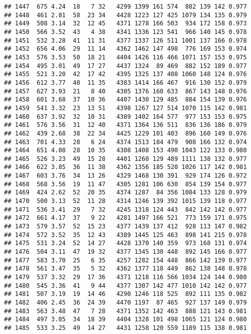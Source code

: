 \documentclass[]{article}
\begin{document}
\begin{verbatim}
## 1447  675 4.24  18   7 32   4299 1399 161 574  882 139 142 0.977
## 1448  461 2.81  58  23 34   4428 1223 127 425 1079 134 135 0.979
## 1449  508 3.14  32  12 45   4371 1278 166 503  934 172 158 0.973
## 1450  566 3.52  43   4 38   4341 1336 123 541  966 140 145 0.978
## 1451  532 3.28  41  11 31   4377 1337 126 511 1001 137 166 0.978
## 1452  656 4.06  29  11 14   4362 1462 147 498  776 169 153 0.974
## 1453  576 3.53  50  18 21   4404 1426 116 466 1071 157 153 0.975
## 1454  495 3.01  49  17 27   4437 1324  89 469  882 152 189 0.977
## 1455  521 3.20  42  17 42   4395 1325 137 408 1060 148 124 0.976
## 1456  612 3.77  40  11 35   4383 1414 166 467  916 130 152 0.979
## 1457  627 3.93  21   8 40   4305 1376 160 633  867 143 148 0.976
## 1458  601 3.68  37  10 36   4407 1430 129 485  884 154 139 0.976
## 1459  541 3.32  23  13 51   4398 1267 127 514 1070 115 142 0.981
## 1460  637 3.92  32  10 31   4389 1402 164 577  977 153 153 0.975
## 1461  576 3.56  31  12 40   4371 1364 136 511  836 136 186 0.979
## 1462  439 2.68  38  22 34   4425 1229 101 403  896 160 149 0.976
## 1463  701 4.33  28   6 24   4374 1513 184 479  908 166 132 0.974
## 1464  651 4.08  28  10 35   4308 1408 153 490 1043 122 133 0.980
## 1465  526 3.23  49  15 28   4401 1260 129 489 1111 138 132 0.977
## 1466  622 3.85  36  11 38   4362 1356 185 520 1026 117 142 0.981
## 1467  603 3.76  34  13 26   4329 1468 130 391  929 174 126 0.972
## 1468  568 3.56  19  11 47   4305 1281 106 630  854 139 154 0.977
## 1469  424 2.62  52  20 35   4374 1287  84 356 1084 133 128 0.979
## 1470  500 3.13  52  11 28   4314 1246 139 392 1015 139 118 0.977
## 1471  536 3.41  29   7 32   4245 1318 124 443  842 142 142 0.977
## 1472  661 4.17  37   9 22   4281 1497 166 521  773 159 171 0.975
## 1473  579 3.57  52  15 23   4377 1439 137 412  928 113 147 0.982
## 1474  572 3.52  35  12 43   4389 1445 125 463  898 141 215 0.978
## 1475  531 3.24  52  14 27   4428 1370 140 359  973 168 131 0.974
## 1476  504 3.11  47  19 32   4377 1345 130 448  892 145 166 0.977
## 1477  583 3.70  25   6 35   4257 1282 154 448  866 142 139 0.977
## 1478  561 3.47  35   5 32   4362 1377 118 449  862 138 148 0.978
## 1479  537 3.32  29  17 36   4371 1218 116 566 1034 124 144 0.980
## 1480  545 3.36  41   9 44   4377 1307 142 477 1010 142 142 0.977
## 1481  507 3.19  19  14 46   4290 1246 118 525  892 111 135 0.982
## 1482  406 2.45  36  24 39   4470 1197  87 465  927 137 149 0.979
## 1483  563 3.48  47   7 28   4371 1352 142 463  888 121 143 0.981
## 1484  497 3.05  34  18 39   4404 1328 101 498 1065 121 124 0.980
## 1485  533 3.25  49  14 27   4431 1258 120 559 1189 115 138 0.981

\end{verbatim}
\end{document}
